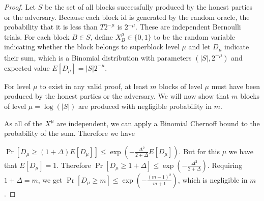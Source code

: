 \begin{proof}
    Let $S$ be the set of all blocks successfully produced by the honest
    parties or the adversary. Because each block id is generated by the random
    oracle, the probability that it is less than $T 2^{-\mu}$ is
    $2^{-\mu}$. These are independent Bernoulli trials. For each block
    $B \in S$, define $X^{\mu}_B \in \{0, 1\}$ to be the random variable
    indicating whether the block belongs to superblock level $\mu$ and let
    $D_\mu$ indicate their sum, which is a Binomial distribution with
    parameters $(|S|, 2^{-\mu})$ and expected value $E[D_{\mu}] =
    |S| 2^{-\mu}$.

    For level $\mu$ to exist in any valid proof, at least $m$ blocks of level
    $\mu$ must have been produced by the honest parties or the adversary. We
    will now show that $m$ blocks of level $\mu = \log(|S|)$ are produced with
    negligible probability in $m$.

    As all of the $X^{\mu}$ are independent, we can apply a Binomial Chernoff
    bound to the probability of the sum. Therefore we have

    $\Pr[D_\mu \geq (1 + \Delta)E[D_\mu]] \leq \exp(-\frac{\Delta^2}{2 +
    \Delta}E[D_\mu])$. But for this $\mu$ we have that $E[D_\mu] = 1$.
    Therefore $\Pr[D_\mu \geq 1 + \Delta] \leq \exp(-\frac{\Delta^2}{2 +
    \Delta})$. Requiring $1 + \Delta = m$, we get $\Pr[D_\mu \geq m] \leq
    \exp(-\frac{(m - 1)^2}{m + 1})$, which is negligible in $m$.
\end{proof}
